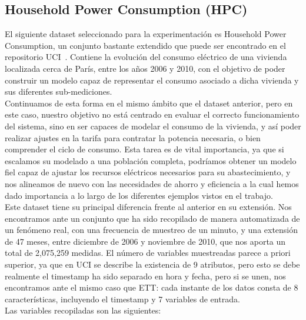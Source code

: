 \subsection{Household Power Consumption (HPC)}

El siguiente dataset seleccionado para la experimentación es Household Power Consumption, un conjunto bastante extendido que puede ser encontrado en el repositorio UCI~\cite{hebrail2006individual}. Contiene la evolución del consumo eléctrico de una vivienda localizada cerca de París, entre los años 2006 y 2010, con el objetivo de poder construir un modelo capaz de representar el consumo asociado a dicha vivienda y sus diferentes sub-mediciones.\\

Continuamos de esta forma en el mismo ámbito que el dataset anterior, pero en este caso, nuestro objetivo no está centrado en evaluar el correcto funcionamiento del sistema, sino en ser capaces de modelar el consumo de la vivienda, y así poder realizar ajustes en la tarifa para contratar la potencia necesaria, o bien comprender el ciclo de consumo. Esta tarea es de vital importancia, ya que si escalamos su modelado a una población completa, podríamos obtener un modelo fiel capaz de ajustar los recursos eléctricos necesarios para su abastecimiento, y nos alineamos de nuevo con las necesidades de ahorro y eficiencia a la cual hemos dado importancia a lo largo de los diferentes ejemplos vistos en el trabajo.\\

Este dataset tiene su principal diferencia frente al anterior en su extensión. Nos encontramos ante un conjunto que ha sido recopilado de manera automatizada de un fenómeno real, con una frecuencia de muestreo de un minuto, y una extensión de 47 meses, entre diciembre de 2006 y noviembre de 2010, que nos aporta un total de 2,075,259 medidas. El número de variables muestreadas parece a priori superior, ya que en UCI se describe la existencia de 9 atributos, pero esto se debe realmente el timestamp ha sido separado en hora y fecha, pero si se unen, nos encontramos ante el mismo caso que ETT: cada instante de los datos consta de 8 características, incluyendo el timestamp y 7 variables de entrada.\\

Las variables recopiladas son las siguientes:

